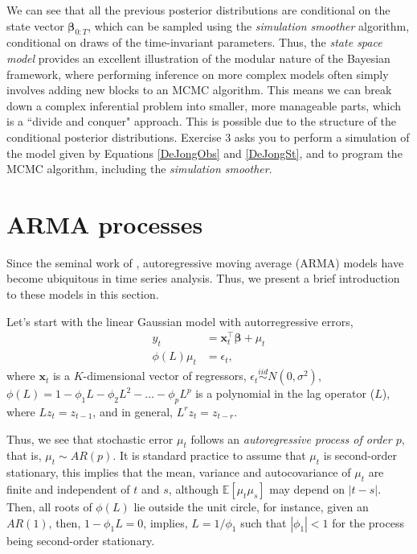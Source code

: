 We can see that all the previous posterior distributions are conditional on the state vector $\bm{\beta}_{0:T}$, which can be sampled using the \textit{simulation smoother} algorithm, conditional on draws of the time-invariant parameters. Thus, the \textit{state space model} provides an excellent illustration of the modular nature of the Bayesian framework, where performing inference on more complex models often simply involves adding new blocks to an MCMC algorithm. This means we can break down a complex inferential problem into smaller, more manageable parts, which is a ``divide and conquer" approach. This is possible due to the structure of the conditional posterior distributions. Exercise 3 asks you to perform a simulation of the model given by Equations \ref{DeJongObs} and \ref{DeJongSt}, and to program the MCMC algorithm, including the \textit{simulation smoother}.

\section{ARMA processes}\label{sec82}

Since the seminal work of \cite{box_jenkins_1976}, autoregressive moving average (ARMA) models have become ubiquitous in time series analysis. Thus, we present a brief introduction to these models in this section.

Let's start with the linear Gaussian model with autorregressive errors,
\begin{align}
	y_t & = \bm{x}_t^{\top}\bm{\beta}+\mu_t\label{eq1}\\
	\phi(L)\mu_t & = \epsilon_t \label{eq2}, 
\end{align}
where $\bm{x}_t$ is a $K$-dimensional vector of regressors, $\epsilon_t \stackrel{iid}{\sim} N(0,\sigma^2)$, $\phi(L)=1-\phi_1L-\phi_2L^2-\dots-\phi_pL^p$ is a polynomial in the lag operator ($L$), where $Lz_t=z_{t-1}$, and in general, $L^rz_t=z_{t-r}$.

Thus, we see that stochastic error $\mu_t$ follows an \textit{autoregressive process of order $p$}, that is, $\mu_t\sim AR(p)$. It is standard practice to assume that $\mu_t$ is second-order stationary, this implies that the mean, variance and autocovariance of $\mu_t$ are finite and independent of $t$ and $s$, although $\mathbb{E}[\mu_t\mu_s]$ may depend on $|t-s|$. Then, all roots of $\phi(L)$ lie outside the unit circle, for instance, given an $AR(1)$, then, $1-\phi_1L=0$, implies, $L=1/\phi_1$ such that  $|\phi_1|<1$ for the process being second-order stationary.

